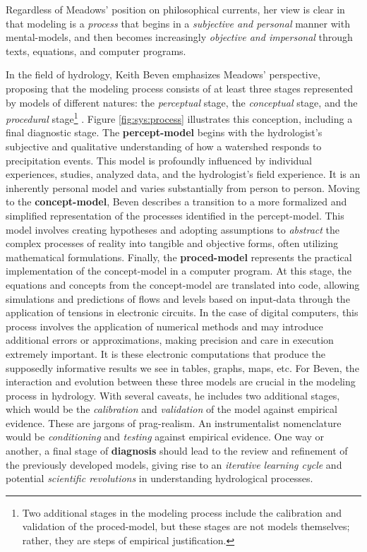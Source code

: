 \documentclass[./main_en.tex]{subfiles}
\begin{document}
\noindent Regardless of Meadows' position on philosophical currents, her view is clear in that modeling is a \textit{process} that begins in a \textit{subjective and personal} manner with \gls{mental-models}, and then becomes increasingly \textit{objective and impersonal} through texts, equations, and computer programs.

\par In the field of \gls{hydrology}, Keith Beven emphasizes Meadows' perspective, proposing that the modeling process consists of at least three stages represented by models of different natures: the \textit{perceptual} stage, the \textit{conceptual} stage, and the \textit{procedural} stage\footnote{Two additional stages in the modeling process include the calibration and validation of the \gls{proced-model}, but these stages are not models themselves; rather, they are steps of empirical justification.} \cite{beven2011}. Figure \ref{fig:sys:process} illustrates this conception, including a final diagnostic stage. The \textbf{\gls{percept-model}} begins with the hydrologist's subjective and qualitative understanding of how a watershed responds to precipitation events. This \gls{model} is profoundly influenced by individual experiences, studies, analyzed data, and the hydrologist's field experience. It is an inherently personal \gls{model} and varies substantially from person to person. Moving to the \textbf{\gls{concept-model}}, Beven describes a transition to a more formalized and simplified representation of the processes identified in the \gls{percept-model}. This \gls{model} involves creating hypotheses and adopting assumptions to \textit{abstract} the complex processes of reality into tangible and objective forms, often utilizing mathematical formulations. Finally, the \textbf{\gls{proced-model}} represents the practical implementation of the \gls{concept-model} in a computer program. At this stage, the equations and concepts from the \gls{concept-model} are translated into code, allowing simulations and predictions of flows and levels based on \gls{input-data} through the application of tensions in electronic circuits. In the case of digital computers, this process involves the application of numerical methods and may introduce additional errors or approximations, making precision and care in execution extremely important. It is these electronic computations that produce the supposedly informative results we see in tables, graphs, maps, etc. For Beven, the interaction and evolution between these three models are crucial in the modeling process in \gls{hydrology}. With several caveats, he includes two additional stages, which would be the \textit{calibration} and \textit{validation} of the \gls{model} against empirical evidence. These are jargons of \gls{prag-realism}. An instrumentalist nomenclature would be \textit{conditioning} and \textit{testing} against empirical evidence. One way or another, a final stage of \textbf{diagnosis} should lead to the review and refinement of the previously developed models, giving rise to an \textit{iterative learning cycle} and potential \textit{scientific revolutions} in understanding hydrological processes.
\end{document}
